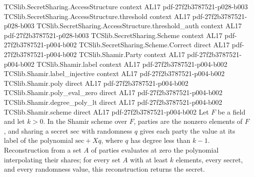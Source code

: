 \begin{theorem}
\label{TCSlib.Shamir.correct}
\leanok
\proofstep
  {TCSlib.SecretSharing.AccessStructure}
  {context}
  {AL17}
  {pdf-27f2b3787521-p028-b003}
\proofstep
  {TCSlib.SecretSharing.AccessStructure.threshold}
  {context}
  {AL17}
  {pdf-27f2b3787521-p028-b003}
\proofstep
  {TCSlib.SecretSharing.AccessStructure.threshold_auth}
  {context}
  {AL17}
  {pdf-27f2b3787521-p028-b003}
\proofstep
  {TCSlib.SecretSharing.Scheme}
  {context}
  {AL17}
  {pdf-27f2b3787521-p004-b002}
\proofstep
  {TCSlib.SecretSharing.Scheme.Correct}
  {direct}
  {AL17}
  {pdf-27f2b3787521-p004-b002}
\proofstep
  {TCSlib.Shamir.Party}
  {context}
  {AL17}
  {pdf-27f2b3787521-p004-b002}
\proofstep
  {TCSlib.Shamir.label}
  {context}
  {AL17}
  {pdf-27f2b3787521-p004-b002}
\proofstep
  {TCSlib.Shamir.label_injective}
  {context}
  {AL17}
  {pdf-27f2b3787521-p004-b002}
\proofstep
  {TCSlib.Shamir.poly}
  {direct}
  {AL17}
  {pdf-27f2b3787521-p004-b002}
\proofstep
  {TCSlib.Shamir.poly_eval_zero}
  {direct}
  {AL17}
  {pdf-27f2b3787521-p004-b002}
\proofstep
  {TCSlib.Shamir.degree_poly_lt}
  {direct}
  {AL17}
  {pdf-27f2b3787521-p004-b002}
\proofstep
  {TCSlib.Shamir.scheme}
  {direct}
  {AL17}
  {pdf-27f2b3787521-p004-b002}
Let $F$ be a field and let $k>0$. In the Shamir scheme over $F$, parties are the nonzero
elements of $F$, and sharing a secret $\mathrm{sec}$ with randomness $q$ gives each
party the value at its label of the polynomial $\mathrm{sec}+Xq$, where $q$ has degree
less than $k-1$. Reconstruction from a set $A$ of parties evaluates at zero the
polynomial interpolating their shares; for every set $A$ with at least $k$ elements,
every secret, and every randomness value, this reconstruction returns the secret.
\end{theorem}


